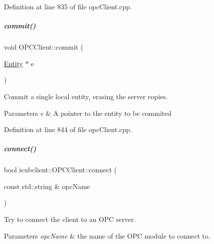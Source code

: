 Definition at line 835 of file opc\+Client.\+cpp.

\mbox{\label{group__icubclient__clients_abaec4d0b527ced007679b857446f09ec}} 
\subparagraph{\texorpdfstring{commit()}{commit()}\hspace{0.1cm}{\footnotesize\ttfamily [2/2]}}
{\footnotesize\ttfamily void O\+P\+C\+Client\+::commit (\begin{DoxyParamCaption}\item[{\hyperlink{group__icubclient__representations_classicubclient_1_1Entity}{Entity} $\ast$}]{e }\end{DoxyParamCaption})}



Commit a single local entity, erasing the server copies. 


\begin{DoxyParams}{Parameters}
{\em e} & A pointer to the entity to be commited \\
\hline
\end{DoxyParams}


Definition at line 844 of file opc\+Client.\+cpp.

\mbox{\label{group__icubclient__clients_ab5223fad505130bd95aba586889edefc}} 
\subparagraph{\texorpdfstring{connect()}{connect()}}
{\footnotesize\ttfamily bool icubclient\+::\+O\+P\+C\+Client\+::connect (\begin{DoxyParamCaption}\item[{const std\+::string \&}]{opc\+Name }\end{DoxyParamCaption})\hspace{0.3cm}{\ttfamily [inline]}}



Try to connect the client to an O\+PC server. 


\begin{DoxyParams}{Parameters}
{\em opc\+Name} & the name of the O\+PC module to connect to. \\
\hline
\end{DoxyParams}


